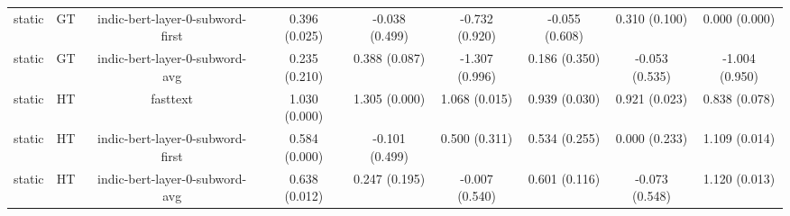 \begin{sidewaystable}[htb]
\begin{tabular}{@{}ccccccccc@{}}
        static & GT & indic-bert-layer-0-subword-first & 0.396 (0.025) & -0.038 (0.499) & -0.732 (0.920) & -0.055 (0.608) & 0.310 (0.100) & 0.000 (0.000) \\
        static & GT & indic-bert-layer-0-subword-avg & 0.235 (0.210) & 0.388 (0.087) & -1.307 (0.996) & 0.186 (0.350) & -0.053 (0.535) & -1.004 (0.950) \\
        static & HT & fasttext & 1.030 (0.000) & 1.305 (0.000) & 1.068 (0.015) & 0.939 (0.030) & 0.921 (0.023) & 0.838 (0.078) \\
        static & HT & indic-bert-layer-0-subword-first & 0.584 (0.000) & -0.101 (0.499) & 0.500 (0.311) & 0.534 (0.255) & 0.000 (0.233) & 1.109 (0.014) \\
        static & HT & indic-bert-layer-0-subword-avg & 0.638 (0.012) & 0.247 (0.195) & -0.007 (0.540) & 0.601 (0.116) & -0.073 (0.548) & 1.120 (0.013) \\
        \bottomrule
    \end{tabular}
\end{sidewaystable}
